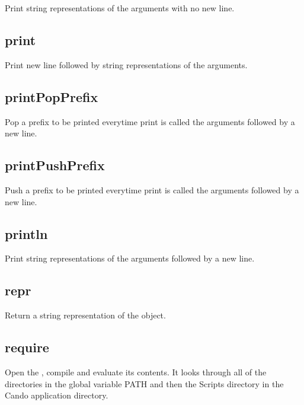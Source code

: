 \begin{itemize}
  Print string representations of the arguments with no new line.

\subsection{print}
  \par

  Print new line followed by string representations of the arguments.

\subsection{printPopPrefix}
  \par

  Pop a prefix to be printed everytime print is called the arguments followed by a new line.

\subsection{printPushPrefix}
  \par

  Push a prefix to be printed everytime print is called the arguments followed by a new line.

\subsection{println}
  \par

  Print string representations of the arguments followed by a new line.

\subsection{repr}

  Return a string representation of the object.

\subsection{require}

  Open the , compile and evaluate its contents.
  It looks through all of the directories in the global variable PATH and then 
  the Scripts directory in the Cando application directory.



\end{itemize}
